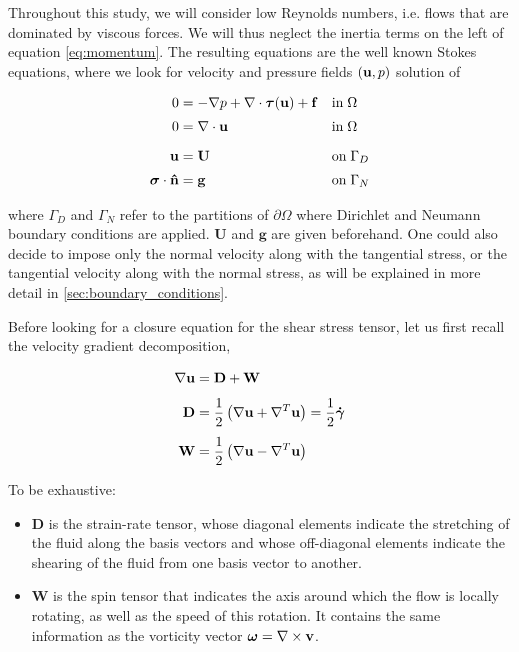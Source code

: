 \documentclass[11 pt]{report}
\begin{document}
Throughout this study, we will consider low Reynolds numbers, i.e. flows that are dominated by viscous forces. We will thus neglect the inertia terms on the left of equation \eqref{eq:momentum}. The resulting equations are the well known Stokes equations, where we look for velocity and pressure fields $(\mathbf{u},p)$ solution of
\begin{empheqboxed}
    \begin{align}
        0 &= -\nabla p + \nabla \cdot \boldsymbol \tau(\mathbf{u}) + \mathbf{f} &&\text{in} \; \Omega \label{eq:momentum} \\[2pt]
        0 &= \nabla \cdot \mathbf{u} &&\text{in}\; \Omega \label{eq:mass}\\[6pt]
        \mathbf{u} &= \mathbf{U} &&\text{on}\; \Gamma_{D} \label{eq:Dirichlet}\\[2pt]
        \boldsymbol \sigma \cdot \mathbf{\hat n} &= \mathbf{g} &&\text{on}\; \Gamma_{N} \label{eq:Neumann}
    \end{align}
\end{empheqboxed}
where $\Gamma_{D}$ and $\Gamma_{N}$ refer to the partitions of $\partial \Omega$ where Dirichlet and Neumann boundary conditions are applied. $\mathbf{U}$ and $\mathbf{g}$ are given beforehand. One could also decide to impose only the normal velocity along with the tangential stress, or the tangential velocity along with the normal stress, as will be explained in more detail in \cref{sec:boundary_conditions}.

Before looking for a closure equation for the shear stress tensor, let us first recall the velocity gradient decomposition,
\begin{empheqboxed}
    \begin{align}
        \nabla \mathbf{u} &= \mathbf{D} + \mathbf{W}\\[4pt]
        \mathbf{D} &= \frac{1}{2} \left(\nabla \mathbf{u} + \nabla^T \mathbf{u}\right) = \frac{1}{2} \boldsymbol{\dot \gamma}\\[4pt]
        \mathbf{W} &= \frac{1}{2} \left(\nabla \mathbf{u} - \nabla^T \mathbf{u}\right)
    \end{align}
\end{empheqboxed}

To be exhaustive:
\begin{itemize}[label=---]
    \item $\mathbf{D}$ is the strain-rate tensor, whose diagonal elements indicate the stretching of the fluid along the basis vectors and whose off-diagonal elements indicate the shearing of the fluid from one basis vector to another.
    \item $\mathbf{W}$ is the spin tensor that indicates the axis around which the flow is locally rotating, as well as the speed of this rotation. It contains the same information as the vorticity vector $\boldsymbol\omega = \nabla \times \mathbf{v}$.
\end{itemize} 
\end{document}
